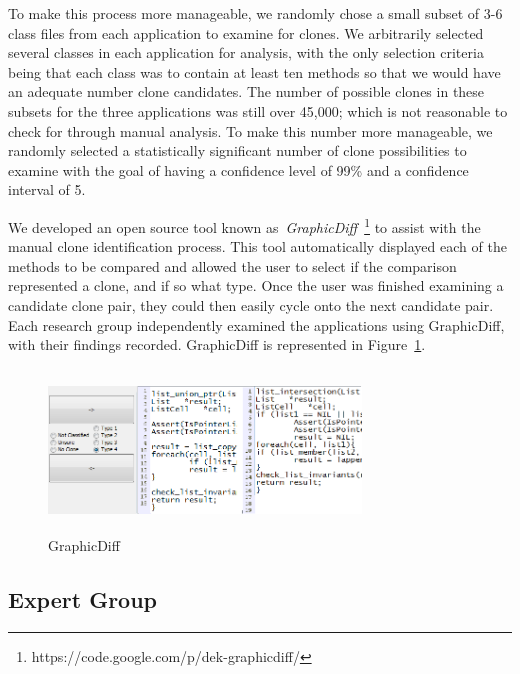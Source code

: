 \documentclass{sig-alternate}
\begin{document}

To make this process more manageable, we randomly chose a small subset of 3-6 class files from each application to examine for clones. We arbitrarily selected several classes in each application for analysis, with the only selection criteria being that each class was to contain at least ten methods so that we would have an adequate number clone candidates. The number of possible clones in these subsets for the three applications was still over 45,000; which is not reasonable to check for through manual analysis. To make this number more manageable, we randomly selected a statistically significant number of clone possibilities to examine with the goal of having a confidence level of 99\% and a confidence interval of 5.



We developed an open source tool known as~\emph{GraphicDiff}~\footnote{https://code.google.com/p/dek-graphicdiff/} to assist with the manual clone identification process. This tool automatically displayed each of the methods to be compared and allowed the user to select if the comparison represented a clone, and if so what type. Once the user was finished examining a candidate clone pair, they could then easily cycle onto the next candidate pair. Each research group independently examined the applications using GraphicDiff, with their findings recorded. GraphicDiff is represented in Figure~\ref{fig:graphicdiff}. %

\begin{figure}[ht!]
\centering
\includegraphics[width=83mm,height=43mm]{images/gd5.png}
\caption{GraphicDiff}
\label{fig:graphicdiff}
\end{figure}

\subsection{Expert Group}
\end{document}
